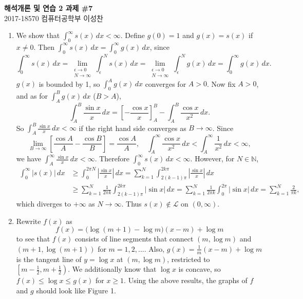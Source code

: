\documentclass[12pt]{report}
\newcommand{\numl}[1]{\item[\large\textbf{\sffamily #1.}]}
\newcommand{\mc}[1]{\mathcal{#1}}
\newcommand{\abs}[1]{\left| #1 \right|}
\newcommand{\ra}{\rightarrow}
\newcommand{\N}{\mathbb{N}}
\renewcommand{\d}[1]{\,d{#1}}
\begin{document}
\begin{center}
    \textbf{\Large 해석개론 및 연습 2 과제 \#7}\\
    \large 2017-18570 컴퓨터공학부 이성찬
\end{center}
\begin{enumerate}

    \numl{1} We show that \(\int_0^\infty s(x) \d{x} < \infty\). Define \(g(0) = 1\) and \(g(x) = s(x)\) if \(x \neq 0\). Then \(\int_0^\infty s(x)\d{x} = \int_0^\infty g(x) \d{x}\), since
    \[
        \int_0^\infty s(x) \d{x} = \lim_{\substack{\epsilon \ra 0\\N \ra \infty}} \int_\epsilon^N s(x) \d{x} = \lim_{\substack{\epsilon \ra 0\\N \ra \infty}} \int_\epsilon^N g(x) \d{x} = \int_0^\infty g(x) \d{x}.
    \]
    \(g(x)\) is bounded by 1, so \(\int_0^A g(x)\d{x}\) converges for \(A > 0\). Now fix \(A > 0\), and as for \(\int_A^B g(x)\d{x}\) (\(B > A\)),
    \[
        \int_A^B \frac{\sin x}{x} \d{x} = \left[-\frac{\cos x}{x}\right]_A^B - \int_A^B \frac{\cos x}{x^2} \d{x}.
    \]
    So \(\int_A^B \frac{\sin x}{x}\d{x} < \infty\) if the right hand side converges as \(B \ra \infty\). Since
    \[
        \lim_{B \ra \infty} \left[\frac{\cos A}{A} - \frac{\cos B}{B}\right] = \frac{\cos A}{A}, \quad \int_A^\infty \frac{\cos x}{x^2} \d{x} < \int_A^\infty \frac{1}{x^2} \d{x} < \infty,
    \]
    we have \(\int_A^\infty \frac{\sin x}{x} \d{x} < \infty\). Therefore \(\int_0^\infty s(x)\d{x} < \infty\). However, for \(N \in \N\),
    \[
        \begin{aligned}
            \int_0^\infty \abs{s(x)}\d{x} & \geq \int_0^{2\pi N} \abs{\frac{\sin x}{x}} \d{x} = \sum_{k=1}^{N} \int_{2(k-1)\pi}^{2k\pi}\abs{\frac{\sin x}{x}} \d{x}                                                              \\
                                          & \geq \sum_{k=1}^{N} \frac{1}{2\pi k} \int_{2(k-1)\pi}^{2k\pi} \abs{\sin x}\d{x} =\sum_{k=1}^{N} \frac{1}{2\pi k} \int_{0}^{2\pi} \abs{\sin x}\d{x} = \sum_{k=1}^{N} \frac{2}{\pi k},
        \end{aligned}
    \]
    which diverges to \(+\infty\) as \(N \ra \infty\). Thus \(s(x) \notin \mc{L}\) on \((0, \infty)\).

    \numl{2} Rewrite \(f(x)\) as
    \[
        f(x) = \bigl(\log(m+1) - \log m\bigr) (x - m) + \log m
    \]
    to see that \(f(x)\) consists of line segments that connect \((m, \log m)\) and \((m+1, \log(m+1))\) for \(m = 1, 2, \dots.\) Also, \(g(x) = \frac{1}{m}(x - m) + \log m\) is the tangent line of \(y = \log x\) at \((m, \log m)\), restricted to \(\left[m - \frac{1}{2}, m + \frac{1}{2}\right)\). We additionally know that \(\log x\) is concave, so \(f(x) \leq \log x \leq g(x)\) for \(x\geq 1\). Using the above results, the graphs of \(f\) and \(g\) should look like Figure 1.


\end{enumerate}
\end{document}
